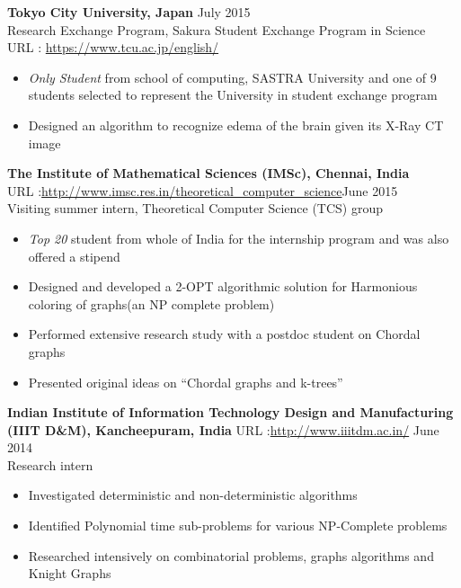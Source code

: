 \documentclass[margin, 10pt]{res} %
\begin{document}
\begin{resume}
{{\textbf{Tokyo City University, Japan} \hfill July 2015 \\
Research Exchange Program, Sakura Student Exchange Program in Science \\URL : \url{https://www.tcu.ac.jp/english/}
\begin{itemize} \itemsep -2pt %
\item \emph{Only Student} from school of computing, SASTRA University and one of 9 students selected to represent the University in student exchange program
\item Designed an algorithm to recognize edema of the brain given its X-Ray CT image
\end{itemize}
{\textbf{The Institute of Mathematical Sciences (IMSc), Chennai, India}\\  URL :\url{http://www.imsc.res.in/theoretical_computer_science}\hfill June 2015 \\
Visiting summer intern, Theoretical Computer Science (TCS) group
\begin{itemize} \itemsep -2pt %
\item \emph{Top 20} student from whole of India for the internship program and was also offered a  stipend
\item Designed and developed a 2-OPT algorithmic solution for Harmonious coloring of graphs(an NP complete problem)
\item Performed extensive research study with a postdoc student on Chordal graphs
\item Presented original ideas on ``Chordal graphs and k-trees''
\end{itemize}
{\textbf{Indian Institute of Information Technology Design and Manufacturing (IIIT D\&M), Kancheepuram, India}  URL :\url{http://www.iiitdm.ac.in/} \hfill June 2014 \\
Research intern
\begin{itemize} \itemsep -2pt %
\item Investigated deterministic and non-deterministic algorithms
\item Identified Polynomial time sub-problems for various NP-Complete problems
\item Researched intensively on combinatorial problems, graphs algorithms and Knight Graphs
\end{itemize}

}}}}
\end{resume}
\end{document}
